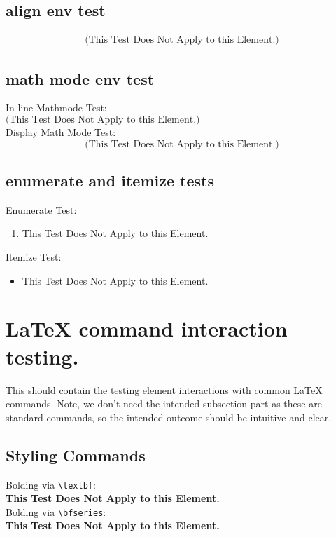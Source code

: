 \documentclass{ximera}
\begin{document}
    \subsection{align env test}
        \begin{align}
            \text{(This Test Does Not Apply to this Element.)}
        \end{align}

    \subsection{math mode env test}
        In-line Mathmode Test:\\
            $\text{(This Test Does Not Apply to this Element.)}$\\
        Display Math Mode Test:\\
        \[
            \text{(This Test Does Not Apply to this Element.)}
        \]

    \subsection{enumerate and itemize tests}
        Enumerate Test:\\
        \begin{enumerate}
            \item This Test Does Not Apply to this Element.
        \end{enumerate}
        Itemize Test:\\
        \begin{itemize}
            \item This Test Does Not Apply to this Element.
        \end{itemize}

\section{\LaTeX{} command interaction testing.}
    This should contain the testing element interactions with common \LaTeX{} commands.
    Note, we don't need the intended subsection part as these are standard commands,
    so the intended outcome should be intuitive and clear.

    \subsection{Styling Commands}
        Bolding via \verb|\textbf|:\\
        \textbf{This Test Does Not Apply to this Element.}\\
        Bolding via \verb|\bfseries|:\\
        {\bfseries This Test Does Not Apply to this Element.}\\
\end{document}
